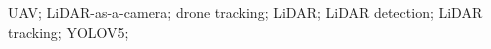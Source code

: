 \begin{abstract}

\end{abstract}

\begin{IEEEkeywords}

    UAV; LiDAR-as-a-camera; drone tracking; LiDAR;
    LiDAR detection; LiDAR tracking; YOLOV5; 

\end{IEEEkeywords}